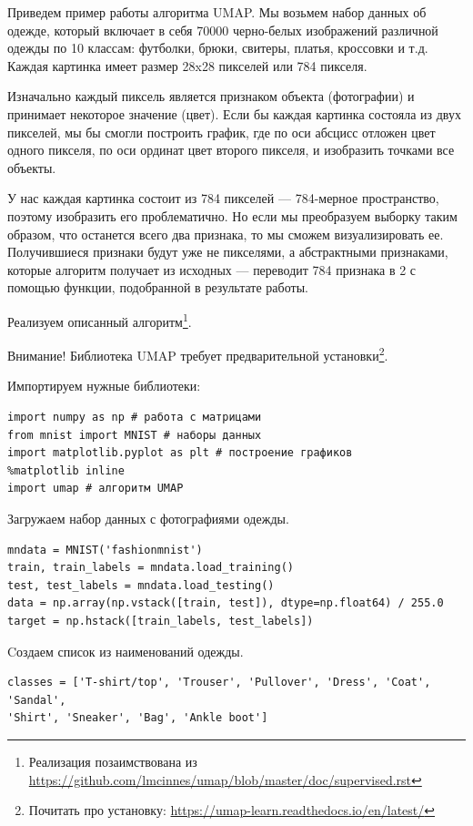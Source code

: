 	Приведем пример работы алгоритма UMAP. Мы возьмем набор данных об одежде, который включает в себя 70000 черно-белых изображений различной одежды по 10 классам: футболки, брюки, свитеры, платья, кроссовки и т.д. Каждая картинка имеет размер 28x28 пикселей или 784 пикселя.
	
	Изначально каждый пиксель является признаком объекта (фотографии) и принимает некоторое значение (цвет). Если бы каждая картинка состояла из двух пикселей, мы бы смогли построить график, где по оси абсцисс отложен цвет одного пикселя, по оси ординат цвет второго пикселя, и изобразить точками все объекты.
	
	У нас каждая картинка состоит из 784 пикселей --- 784-мерное пространство, поэтому изобразить его проблематично. Но если мы преобразуем выборку таким образом, что останется всего два признака, то мы сможем визуализировать ее. Получившиеся признаки будут уже не пикселями, а абстрактными признаками, которые алгоритм получает из исходных --- переводит 784 признака в 2 с помощью функции, подобранной в результате работы.
	
	Реализуем описанный алгоритм\footnote{Реализация позаимствована из \url{https://github.com/lmcinnes/umap/blob/master/doc/supervised.rst}}.
	
	Внимание! Библиотека UMAP требует предварительной установки\footnote{Почитать про установку: \url{https://umap-learn.readthedocs.io/en/latest/}}.
	
	Импортируем нужные библиотеки:
	\begin{verbatim}
import numpy as np # работа с матрицами
from mnist import MNIST # наборы данных
import matplotlib.pyplot as plt # построение графиков
%matplotlib inline
import umap # алгоритм UMAP
	\end{verbatim}
	
	Загружаем набор данных с фотографиями одежды.
	\begin{verbatim}
mndata = MNIST('fashionmnist')
train, train_labels = mndata.load_training() 
test, test_labels = mndata.load_testing()
data = np.array(np.vstack([train, test]), dtype=np.float64) / 255.0
target = np.hstack([train_labels, test_labels])
	\end{verbatim}

	Cоздаем список из наименований одежды.
\begin{verbatim}
classes = ['T-shirt/top', 'Trouser', 'Pullover', 'Dress', 'Coat', 'Sandal', 
'Shirt', 'Sneaker', 'Bag', 'Ankle boot']
\end{verbatim}


